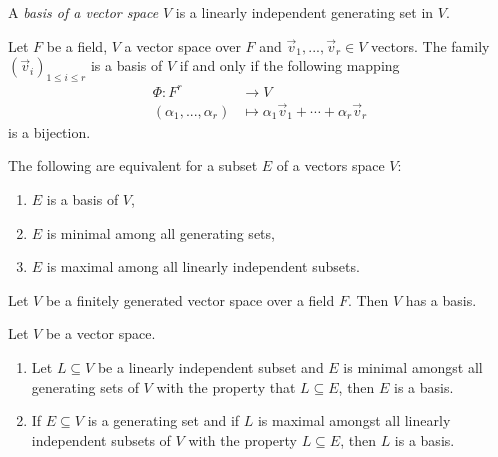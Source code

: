 \documentclass{article}
\begin{document}
\begin{definition}
    A \emph{basis of a vector space} $V$ is a linearly independent generating
    set in $V$.
\end{definition}

\begin{theorem}[Notes 1.5.11]
    Let $F$ be a field, $V$ a vector space over $F$ and $\vec v_1,...,\vec v_r\in V$
    vectors. The family $\left(\vec v_i\right)_{1\leq i\leq r}$ is a basis of $V$
    if and only if the following mapping
    \begin{align*}
        \Phi:F^r                & \to V                                                \\
        (\alpha_1,...,\alpha_r) & \mapsto \alpha_1\vec v_1 + \cdots + \alpha_r\vec v_r
    \end{align*}
    is a bijection.
\end{theorem}

\begin{theorem}[Theorem 1.5.12]
    The following are equivalent for a subset $E$ of a vectors space $V$:
    \begin{enumerate}
        \item $E$ is a basis of $V$,
        \item $E$ is minimal among all generating sets,
        \item $E$ is maximal among all linearly independent subsets.
    \end{enumerate}
\end{theorem}

\begin{corollary}[Notes 1.5.13]
    Let $V$ be a finitely generated vector space over a field $F$. Then $V$
    has a basis.
\end{corollary}

\begin{theorem}[Notes 1.5.14]
    Let $V$ be a vector space.
    \begin{enumerate}
        \item Let $L\subseteq V$ be a linearly independent subset and $E$ is minimal
              amongst all generating sets of $V$ with the property that $L\subseteq E$,
              then $E$ is a basis.
        \item If $E\subseteq V$ is a generating set and if $L$ is maximal amongst all
              linearly independent subsets of $V$ with the property $L\subseteq E$, then
              $L$ is a basis.
    \end{enumerate}
\end{theorem}
\end{document}
